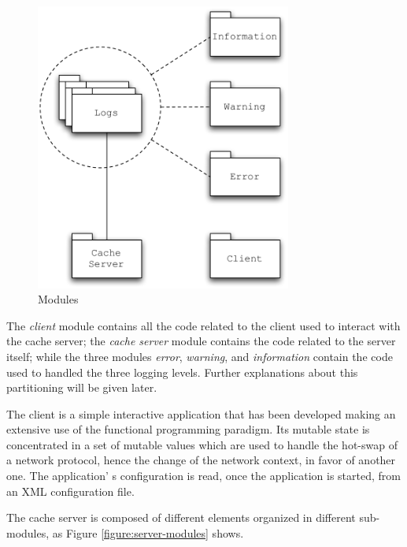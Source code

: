\documentclass[11pt,a4paper]{article}
\begin{document}
\begin{figure}
\begin{center}
\includegraphics[width=0.75\textwidth]{figures/Modules.pdf}
\caption{Modules}
\label{figure:modules}
\end{center}
\end{figure}

The \textit{client} module contains all the code related to the client used to interact with the cache server; the \textit{cache server} module contains the code related to the server itself; while the three modules \textit{error}, \textit{warning}, and \textit{information} contain the code used to handled the three logging levels. Further explanations about this partitioning will be given later.

The client is a simple interactive application that has been developed making an extensive use of the functional programming paradigm. Its mutable state is concentrated in a set of mutable values which are used to handle the hot-swap of a network protocol, hence the change of the network context, in favor of another one. The application' s configuration is read, once the application is started, from an XML configuration file.

The cache server is composed of different elements organized in different sub-modules, as Figure \ref{figure:server-modules} shows.
\end{document}
